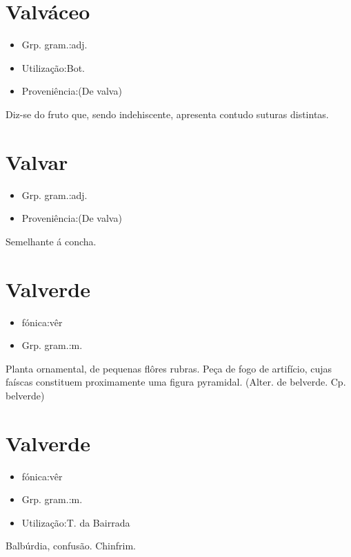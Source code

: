 \documentclass{article}
\begin{document}
\section{Valváceo}
\begin{itemize}
\item {Grp. gram.:adj.}
\end{itemize}
\begin{itemize}
\item {Utilização:Bot.}
\end{itemize}
\begin{itemize}
\item {Proveniência:(De \textunderscore valva\textunderscore )}
\end{itemize}
Diz-se do fruto que, sendo indehiscente, apresenta contudo suturas distintas.
\section{Valvar}
\begin{itemize}
\item {Grp. gram.:adj.}
\end{itemize}
\begin{itemize}
\item {Proveniência:(De \textunderscore valva\textunderscore )}
\end{itemize}
Semelhante á concha.
\section{Valverde}
\begin{itemize}
\item {fónica:vêr}
\end{itemize}
\begin{itemize}
\item {Grp. gram.:m.}
\end{itemize}
Planta ornamental, de pequenas flôres rubras.
Peça de fogo de artifício, cujas faíscas constituem proximamente uma figura pyramidal.
(Alter. de \textunderscore belverde\textunderscore . Cp. \textunderscore belverde\textunderscore )
\section{Valverde}
\begin{itemize}
\item {fónica:vêr}
\end{itemize}
\begin{itemize}
\item {Grp. gram.:m.}
\end{itemize}
\begin{itemize}
\item {Utilização:T. da Bairrada}
\end{itemize}
Balbúrdia, confusão.
Chinfrim.
\end{document}
